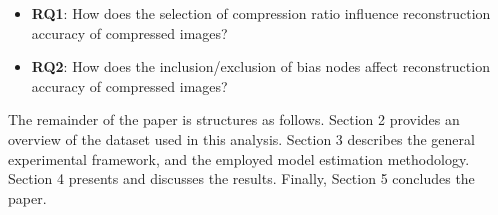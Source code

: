 \begin{itemize}
	\item[] \textbf{RQ1}: How does the selection of compression ratio influence reconstruction accuracy of compressed images?
	\item[] \textbf{RQ2}: How does the inclusion/exclusion of bias nodes affect reconstruction accuracy of compressed images?
\end{itemize}

\noindent
The remainder of the paper is structures as follows. Section 2 provides an overview of the dataset used in this analysis. Section 3 describes the general experimental framework, and the employed model estimation methodology. Section 4 presents and discusses the results. Finally, Section 5 concludes the paper.




